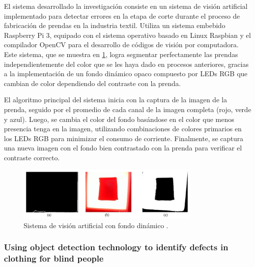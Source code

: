 El sistema desarrollado la investigación \cite{Moreno2017} consiste en un sistema de visión artificial implementado para detectar errores en la etapa de corte durante el proceso de fabricación de prendas en la industria textil. Utiliza un sistema embebido Raspberry Pi 3, equipado con el sistema operativo basado en Linux Raspbian y el compilador OpenCV para el desarrollo de códigos de visión por computadora. Este sistema, que se muestra en \ref{fig:luz_sistema}, logra segmentar perfectamente las prendas independientemente del color que se les haya dado en procesos anteriores, gracias a la implementación de un fondo dinámico opaco compuesto por LEDs RGB que cambian de color dependiendo del contraste con la prenda.

El algoritmo principal del sistema inicia con la captura de la imagen de la prenda, seguido por el promedio de cada canal de la imagen completa (rojo, verde y azul). Luego, se cambia el color del fondo basándose en el color que menos presencia tenga en la imagen, utilizando combinaciones de colores primarios en los LEDs RGB para minimizar el consumo de corriente. Finalmente, se captura una nueva imagen con el fondo bien contrastado con la prenda para verificar el contraste correcto.

\begin{figure}[H]
	\centering
	\includegraphics[width=0.8\textwidth]{img/luz_sistema.png}
	\caption[Sistema de visión artificial con fondo dinámico.]{Sistema de visión artificial con fondo dinámico \cite{Moreno2017}.}
	\label{fig:luz_sistema}
\end{figure}

\subsubsection{Using object detection technology to identify defects in clothing for blind people}

